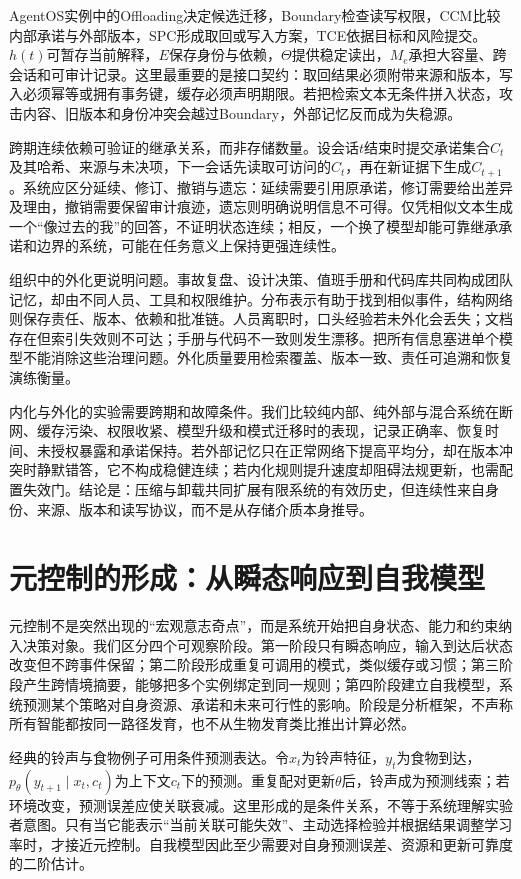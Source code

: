 AgentOS实例中的Offloading决定候选迁移，Boundary检查读写权限，CCM比较内部承诺与外部版本，SPC形成取回或写入方案，TCE依据目标和风险提交。$h(t)$可暂存当前解释，$E$保存身份与依赖，$\Theta$提供稳定读出，$M_e$承担大容量、跨会话和可审计记录。这里最重要的是接口契约：取回结果必须附带来源和版本，写入必须幂等或拥有事务键，缓存必须声明期限。若把检索文本无条件拼入状态，攻击内容、旧版本和身份冲突会越过Boundary，外部记忆反而成为失稳源。

跨期连续依赖可验证的继承关系，而非存储数量。设会话$t$结束时提交承诺集合$C_t$及其哈希、来源与未决项，下一会话先读取可访问的$C_t$，再在新证据下生成$C_{t+1}$。系统应区分延续、修订、撤销与遗忘：延续需要引用原承诺，修订需要给出差异及理由，撤销需要保留审计痕迹，遗忘则明确说明信息不可得。仅凭相似文本生成一个“像过去的我”的回答，不证明状态连续；相反，一个换了模型却能可靠继承承诺和边界的系统，可能在任务意义上保持更强连续性。

组织中的外化更说明问题。事故复盘、设计决策、值班手册和代码库共同构成团队记忆，却由不同人员、工具和权限维护。分布表示有助于找到相似事件，结构网络则保存责任、版本、依赖和批准链。人员离职时，口头经验若未外化会丢失；文档存在但索引失效则不可达；手册与代码不一致则发生漂移。把所有信息塞进单个模型不能消除这些治理问题。外化质量要用检索覆盖、版本一致、责任可追溯和恢复演练衡量。

内化与外化的实验需要跨期和故障条件。我们比较纯内部、纯外部与混合系统在断网、缓存污染、权限收紧、模型升级和模式迁移时的表现，记录正确率、恢复时间、未授权暴露和承诺保持。若外部记忆只在正常网络下提高平均分，却在版本冲突时静默错答，它不构成稳健连续；若内化规则提升速度却阻碍法规更新，也需配置失效门。结论是：压缩与卸载共同扩展有限系统的有效历史，但连续性来自身份、来源、版本和读写协议，而不是从存储介质本身推导。

\section{元控制的形成：从瞬态响应到自我模型}
\label{sec:pure_geometric_dynamics_ontogeny}

元控制不是突然出现的“宏观意志奇点”，而是系统开始把自身状态、能力和约束纳入决策对象。我们区分四个可观察阶段。第一阶段只有瞬态响应，输入到达后状态改变但不跨事件保留；第二阶段形成重复可调用的模式，类似缓存或习惯；第三阶段产生跨情境摘要，能够把多个实例绑定到同一规则；第四阶段建立自我模型，系统预测某个策略对自身资源、承诺和未来可行性的影响。阶段是分析框架，不声称所有智能都按同一路径发育，也不从生物发育类比推出计算必然。

经典的铃声与食物例子可用条件预测表达。令$x_t$为铃声特征，$y_t$为食物到达，$p_\theta(y_{t+1}\mid x_t,c_t)$为上下文$c_t$下的预测。重复配对更新$\theta$后，铃声成为预测线索；若环境改变，预测误差应使关联衰减。这里形成的是条件关系，不等于系统理解实验者意图。只有当它能表示“当前关联可能失效”、主动选择检验并根据结果调整学习率时，才接近元控制。自我模型因此至少需要对自身预测误差、资源和更新可靠度的二阶估计。

